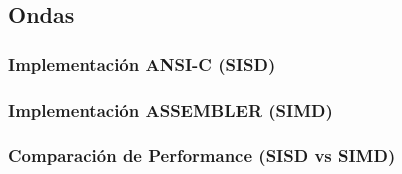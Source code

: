     \subsection{Ondas}
        \subsubsection{Implementación ANSI-C (SISD)}
        \subsubsection{Implementación ASSEMBLER (SIMD)}
        \subsubsection{Comparación de Performance (SISD vs SIMD)}
